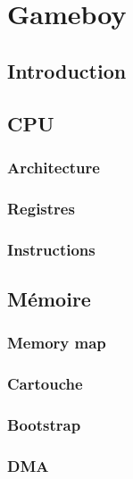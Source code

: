 \documentclass[a4paper]{article}
\begin{document}
\section{Gameboy}
\subsection{Introduction}


\subsection{CPU}
\subsubsection{Architecture}

\subsubsection{Registres}

\subsubsection{Instructions}


\subsection{Mémoire}
\subsubsection{Memory map}

\subsubsection{Cartouche}

\subsubsection{Bootstrap}

\subsubsection{DMA}

\end{document}
